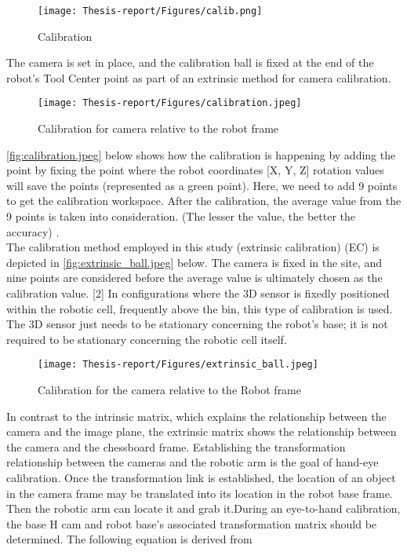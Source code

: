 \documentclass[12pt]{article}
\begin{document}
\begin{figure}[h]
    \centering
    \texttt{[image: Thesis-report/Figures/calib.png]}
    \caption{Calibration \cite{ref2} }
    \label{fig:Photoneo Cmaera}
\end{figure}
The camera is set in place, and the calibration ball is fixed at the end of the robot's Tool Center point as part of an extrinsic method for camera calibration.\\
\begin{figure}[h]
    \centering
    \texttt{[image: Thesis-report/Figures/calibration.jpeg]}
    \caption{Calibration for camera relative to the robot frame\cite{ref2}} 
    \label{fig:calibration.jpeg}
\end{figure}
\autoref{fig:calibration.jpeg} below shows how the calibration is happening by adding the point by fixing the point where the robot coordinates [X, Y, Z] rotation values will save the points (represented as a green point). Here, we need to add 9 points to get the calibration workspace. After the calibration, the average value from the 9 points is taken into consideration. (The lesser the value, the better the accuracy) \cite{ref2}.\\ 

The calibration method employed in this study (extrinsic calibration) (EC) is depicted in \autoref{fig:extrinsic_ball.jpeg} below. The camera is fixed in the site, and nine points are considered before the average value is ultimately chosen as the calibration value.  [2]  In configurations where the 3D sensor is fixedly positioned within the robotic cell, frequently above the bin, this type of calibration is used.  The 3D sensor just needs to be stationary concerning the robot's base; it is not required to be stationary concerning the robotic cell itself\cite{ref2}.\\ 

\begin{figure}[h]
    \centering
    \texttt{[image: Thesis-report/Figures/extrinsic\_ball.jpeg]}
    \caption{Calibration for the camera relative to the Robot frame}
    \label{fig:extrinsic_ball.jpeg}
\end{figure}
In contrast to the intrinsic matrix, which explains the relationship between the camera and the image plane, the extrinsic matrix shows the relationship between the camera and the chessboard frame. Establishing the transformation relationship between the cameras and the robotic arm is the goal of hand-eye calibration.  Once the transformation link is established, the location of an object in the camera frame may be translated into its location in the robot base frame. Then the robotic arm can locate it and grab it.During an eye-to-hand calibration, the base H cam and robot base's associated transformation matrix should be determined\cite{ref3}.  The following equation is derived from\\
\end{document}
